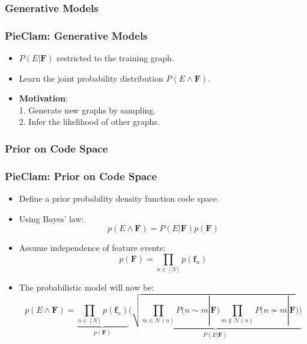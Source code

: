 \documentclass{beamer}
\begin{document}
\subsubsection{Generative Models}
\begin{frame}
\frametitle{PieClam: Generative Models}
\begin{itemize}[itemsep=1em, label=\textbullet]
    \item $P(E | \mathbf{F})$ restricted to the training graph.
    \item Learn the joint probability distribution $P(E \wedge \mathbf{F})$.%
    \item \textbf{Motivation}: 
    \\1. Generate new graphs by sampling. %
    \\2. Infer the likelihood of other graphs.%
\end{itemize}
\end{frame}

\subsubsection{Prior on Code Space}
\begin{frame}
\frametitle{PieClam: Prior on Code Space}
\begin{itemize}[itemsep=1em, label=\textbullet]
    \item Define a prior probability density function code space.%
    \item Using Bayes' law: \[p(E\wedge \mathbf{F}) = P(E|\mathbf{F})p(\mathbf{F})\]%
    \item Assume independence of feature events: \[p(\mathbf{F}) = \prod_{n\in[N]}p(\mathbf{f}_n)\]%

    \item The probabilistic model will now be: \[ p(E\wedge \mathbf{F}) = \underbrace{\prod_{n \in [N]}p(\mathbf{f}_n)}_{p(\mathbf{F})}\underbrace{\bigg(\sqrt{\prod_{m \in \mathcal{N}(n)}P( n\sim m|\mathbf{F})\prod_{m \notin \mathcal{N}(n)} P( n\not\sim m|\mathbf{F}})\bigg)}_{P(E|\mathbf{F})}\]%
        
\end{itemize}
\end{frame}
\end{document}
